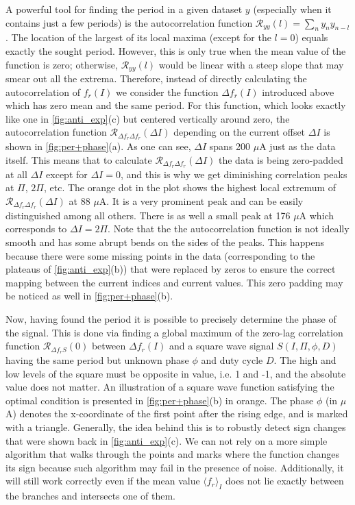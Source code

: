 \documentclass[%
 aip,
 amsmath,amssymb,
 reprint,%
]{revtex4-1}
\begin{document}
A powerful tool for finding the period in a given dataset $y$ (especially when it contains just a few periods) is the autocorrelation function $\mathcal{R}_{y y}(l) = \sum_n y_n y_{n-l}$. The location of the largest of its local maxima (except for the $l=0$) equals exactly the sought period. However, this is only true when the mean value of the function is zero; otherwise, $\mathcal{R}_{y y}(l)$ would be linear with a steep slope that may smear out all the extrema. Therefore, instead of directly calculating the autocorrelation of $f_r (I)$ we consider the function $\Delta f_r (I)$ introduced above which has zero mean and the same period. For this function, which looks exactly like one in \autoref{fig:anti_exp}(c) but centered vertically around zero, the autocorrelation function $\mathcal{R}_{\Delta f_r \Delta f_r}(\Delta I)$ depending on the current offset $\Delta I$ is shown in \autoref{fig:per+phase}(a). As one can see, $\Delta I$ spans 200 $\mu$A just as the data itself. This means that to calculate $\mathcal{R}_{\Delta f_r \Delta f_r}(\Delta I)$ the data is being zero-padded at all $\Delta I$ except for $\Delta I = 0$, and this is why we get diminishing correlation peaks at $\Pi$, $2\Pi$, etc. The orange dot in the plot shows the highest local extremum of $\mathcal{R}_{\Delta f_r \Delta f_r}(\Delta I)$ at 88 $\mu$A. It is a very prominent peak and can be easily distinguished among all others. There is as well a small peak at 176 $\mu$A which corresponds to $\Delta I = 2\Pi$. Note that the the autocorrelation function is not ideally smooth and has some abrupt bends on the sides of the peaks. This happens because there were some missing points in the data (corresponding to the plateaus of \autoref{fig:anti_exp}(b)) that were replaced by zeros to ensure the correct mapping between the current indices and current values. This zero padding may be noticed as well in \autoref{fig:per+phase}(b).

Now, having found the period it is possible to precisely determine the phase of the signal. This is done via finding a global maximum of the zero-lag correlation function  $\mathcal{R}_{\Delta f_r S}(0)$ between $\Delta f_r(I)$ and a square wave signal $S(I, \Pi, \phi, D)$ having the same period but unknown phase $\phi$ and duty cycle $D$. The high and low levels of the square must be opposite in value, i.e. 1 and -1, and the absolute value does not matter.  An illustration of a square wave function satisfying the optimal condition is presented in \autoref{fig:per+phase}(b) in orange. The phase $\phi$ (in $\mu$A) denotes the x-coordinate of the first point after the rising edge, and is marked with a triangle. Generally, the idea behind this is to robustly detect sign changes that were shown back in \autoref{fig:anti_exp}(c). We can not rely on a more simple algorithm that walks through the points and marks where the function changes its sign because such algorithm may fail in the presence of noise. Additionally, it will still work correctly even if the mean value $\langle f_r \rangle_{I}$ does not lie exactly between the branches and intersects one of them.
\end{document}
